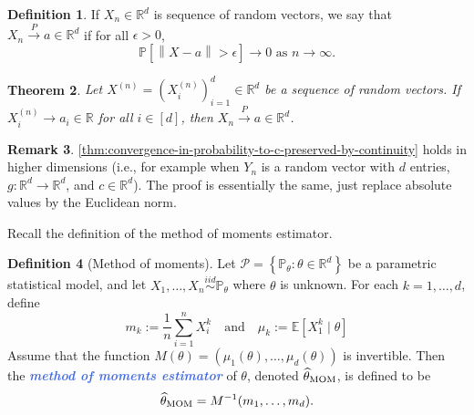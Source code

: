 \documentclass[10pt]{article}
\newtheorem{theorem}{Theorem}
\theoremstyle{definition}
\newtheorem{definition}[theorem]{Definition}
\newtheorem{remark}[theorem]{Remark}
\newcommand{\norm}[1]{\left\lVert#1\right\rVert} %
\newcommand{\1}[1]{\textbf{1}_{\left[#1\right]}} %
\def\R{\mathbb{R}} %
\def\E{\mathbb{E}} %
\def\P{\mathbb{P}} %
\newcommand{\demph}[1]{\textcolor{RoyalBlue}{\textbf{\slshape #1}}} %
\begin{document}
\begin{definition}
  If $X_{n}\in \R^{d}$ is sequence of  random vectors, we say that
  $X_{n}\overset{P}{\to}a\in \R^{d}$ if for all $\epsilon>0$, 
  \begin{equation*}
    \P\left[ \norm{X-a}>\epsilon \right] \to 0 \text{ as }n \to \infty.
  \end{equation*}
\end{definition}

\begin{theorem}
  Let $X^{(n)}=(X^{(n)}_{i})_{i=1}^{d} \in \R^{d}$ be a sequence of random
  vectors. If $X^{(n)}_{i}\to a_{i}\in \R$ for all $i\in [d]$, then
  $X_{n}\overset{P}{\to}a\in \R^{d}$.
\end{theorem}

\begin{remark}
  \label{rmk:generalization-to-Rd}
  \cref{thm:convergence-in-probability-to-c-preserved-by-continuity} holds in
  higher dimensions (i.e., for example when $Y_{n}$ is a random vector with
  $d$ entries, $g:\R^{d}\to \R^{d}$, and $c\in \R^{d}$). The proof is
  essentially the same, just replace absolute values by the Euclidean norm.
\end{remark}

Recall the definition of the method of moments estimator.
\begin{definition}[Method of moments]
  \label{def:method-moments}
  Let $\mathcal{P}= \left\{\P_{\theta}:\theta\in \R^{d}\right\}$ be a
  parametric statistical model, and let
  $X_{1},\ldots,X_{n}\overset{iid}{\sim}\P_{\theta}$ where $\theta$ is
  unknown. For each $k=1,\ldots,d$, define
  \begin{equation*}
    m_{k} := \frac{1}{n}\sum_{i=1}^{n}X_{i}^{k} 
    \quad \text{and} \quad 
    \mu_{k} := \E[X^{k}_{1} \mid \theta]
  \end{equation*}
  Assume that the function
  $M(\theta)= (\mu_{1}(\theta),\ldots,\mu_{d}(\theta))$ is invertible. Then the
  \demph{method of moments estimator} of $\theta$, denoted
  $\widehat{\theta}_{\rm MOM}$, is defined to be
  \begin{equation*}
    \widehat{\theta}_{\rm MOM} = M^{-1}(m_{1},\ldots,m_{d}).
  \end{equation*}
\end{definition}
\end{document}
